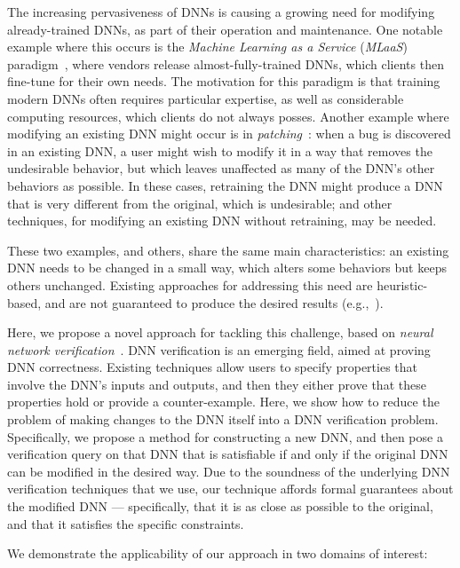\documentclass{easychair}
\begin{document}
The increasing pervasiveness of DNNs is causing a growing need for
modifying already-trained DNNs, as part of their operation and
maintenance. One notable example where this occurs is the
\emph{Machine Learning as a Service} (\emph{MLaaS})
paradigm~\cite{RiGrCa15}, where vendors release almost-fully-trained
DNNs, which clients then fine-tune for their own needs. The motivation
for this paradigm is that training modern DNNs often requires
particular expertise, as well as considerable computing resources,
which clients do not always posses. Another example where modifying an
existing DNN might occur is in \emph{patching}~\cite{SoTh19}: when a
bug is discovered in an existing DNN, a user might wish to modify it
in a way that removes the undesirable behavior, but which leaves
unaffected as many of the DNN's other behaviors as possible. In these
cases, retraining the DNN might produce a DNN that is
very different from the original, which is undesirable; and other
techniques, for modifying an existing DNN without retraining, may be needed.

These two examples, and others, share the same main characteristics: an
existing DNN needs to be changed in a small way, which alters some
behaviors but keeps others unchanged. Existing approaches for
addressing this need are heuristic-based, and are not guaranteed to
produce the desired results (e.g.,~\cite{KaLe18,KaFu18,SoTh19}).

Here, we propose a novel approach for tackling this challenge, based
on \emph{neural network
  verification}~\cite{HuKwWaWu17,KaBaDiJuKo17Reluplex}. DNN
verification is an emerging field, aimed at proving DNN correctness.
Existing techniques allow users to specify properties that involve the
DNN's inputs and outputs, and then they either prove that these properties hold
or provide a counter-example. Here, we show how to reduce the problem
of making changes to the DNN itself into a DNN verification
problem. Specifically, we propose a method for constructing a new DNN,
and then pose a verification query on that DNN that is satisfiable if
and only if the original DNN can be modified in the desired way. Due
to the soundness of the underlying DNN verification techniques that we
use, our technique affords formal guarantees about the modified DNN
--- specifically, that it is as close as possible to the original, and
that it satisfies the specific constraints.


We demonstrate the applicability of our approach in two domains of interest:
\end{document}
